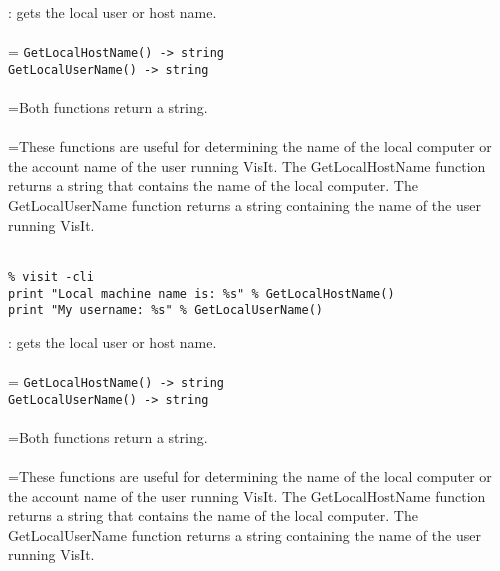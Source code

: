 \documentclass[10pt,a4paper]{report}
\begin{document}
{}
: gets the local user or host name.\\[-3mm]

 \\ 
\hangindent=\parindent 
\verb!GetLocalHostName() -> string!\\ 
\verb!GetLocalUserName() -> string!\\ [-3mm]

 \\ 
\hangindent=\parindent Both functions return a string. \\[-3mm] 

 \\ 
\hangindent=\parindent These functions are useful for determining the name of the local computer or the account name of the user running VisIt. The GetLocalHostName function returns a string that contains the name of the local computer. The GetLocalUserName function returns a string containing the name of the user running VisIt. \\[-3mm] 

\\[-6mm]
\begin{verbatim}% visit -cli
print "Local machine name is: %s" % GetLocalHostName()
print "My username: %s" % GetLocalUserName()
\end{verbatim}
\newpage


{}
: gets the local user or host name.\\[-3mm]

 \\ 
\hangindent=\parindent 
\verb!GetLocalHostName() -> string!\\ 
\verb!GetLocalUserName() -> string!\\ [-3mm]

 \\ 
\hangindent=\parindent Both functions return a string. \\[-3mm] 

 \\ 
\hangindent=\parindent These functions are useful for determining the name of the local computer or the account name of the user running VisIt. The GetLocalHostName function returns a string that contains the name of the local computer. The GetLocalUserName function returns a string containing the name of the user running VisIt. \\[-3mm] 
\end{document}
